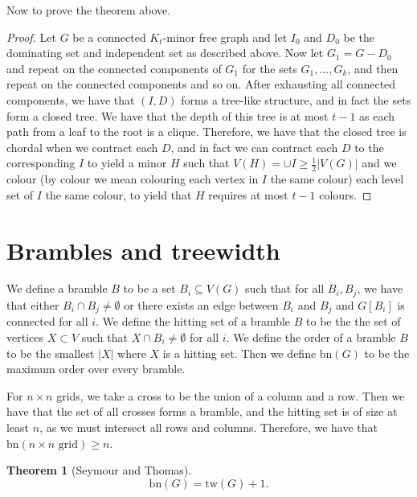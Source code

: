 \documentclass[]{article}
\newcommand{\tw}{\text{tw}}
\newcommand{\bn}{\text{bn}}
\newtheorem{theorem}{Theorem}
\theoremstyle{definition}
\numberwithin{theorem}{section}
\numberwithin{equation}{section}
\begin{document}
Now to prove the theorem above.

\begin{proof}
	Let $G$ be a connected $K_t$-minor free graph and let $I_0$ and $D_0$ be the dominating set and independent set as described above. Now let $G_1 = G - D_0$ and repeat on the connected components of $G_1$ for the sets $G_1, ..., G_k$, and then repeat on the connected components and so on. After exhausting all connected components, we have that $(I, D)$ forms a tree-like structure, and in fact the sets form a closed tree. We have that the depth of this tree is at most $t - 1$ as each path from a leaf to the root is a clique. Therefore, we have that the closed tree is chordal when we contract each $D$, and in fact we can contract each $D$ to the corresponding $I$ to yield a minor $H$ such that $V(H) = \cup I \geq \frac{1}{2} |V(G)|$ and we colour (by colour we mean colouring each vertex in $I$ the same colour) each level set of $I$ the same colour, to yield that $H$ requires at most $t-1$ colours. 
\end{proof}

\section{Brambles and treewidth}
We define a bramble $B$ to be a set $B_i \subseteq V(G)$ such that for all $B_i, B_j$, we have that either $B_i \cap B_j \neq \emptyset$ or there exists an edge between $B_i$ and $B_j$ and $G[B_i]$ is connected for all $i$. We define the hitting set of a bramble $B$ to be the the set of vertices $X \subset V$ such that $X \cap B_i \neq \emptyset$ for all $i$. We define the order of a bramble $B$ to be the smallest $|X|$ where $X$ is a hitting set. Then we define $\bn(G)$ to be the maximum order over every bramble. 

For $n \times n$ grids, we take a cross to be the union of a column and a row. Then we have that the set of all crosses forms a bramble, and the hitting set is of size at least $n$, as we must intersect all rows and columns. Therefore, we have that $\bn(n\times n \text{ grid}) \geq n$. 

\begin{theorem}[Seymour and Thomas]
	\begin{equation}
		\bn(G) = \tw(G) + 1.
	\end{equation}
\end{theorem}
\end{document}
